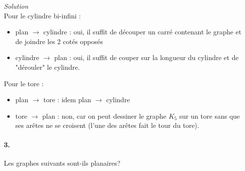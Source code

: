 \textit{Solution}\\

Pour le cylindre bi-infini : 
\begin{itemize}
\item plan $\longrightarrow$ cylindre : oui, il suffit de découper un carré contenant le graphe et de joindre les 2 cotés opposés
\item cylindre $\longrightarrow$ plan : oui, il suffit de couper sur la longueur du cylindre et de "dérouler" le cylindre. \\
\end{itemize}

Pour le tore : 
\begin{itemize}
\item plan $\longrightarrow$ tore : idem plan $\longrightarrow$ cylindre
\item tore $\longrightarrow$ plan : non, car on peut dessiner le graphe $K_5$ sur un tore sans que ses arêtes ne se croisent (l'une des arêtes fait le tour du tore).
\end{itemize}


\paragraph{3. }Les graphes suivants sont-ils planaires?

